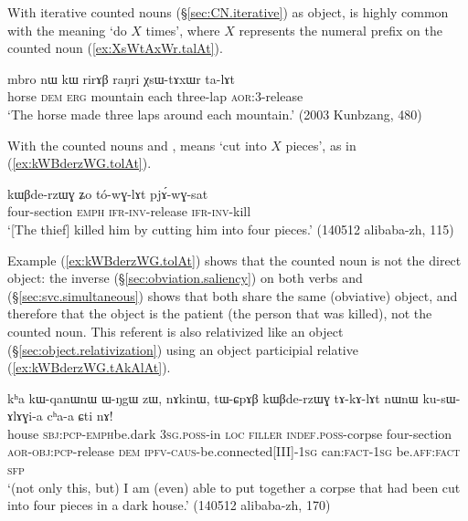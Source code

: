With iterative counted nouns (§\ref{sec:CN.iterative}) as object,  is highly common with the meaning `do $X$ times', where $X$ represents the numeral prefix on the counted noun  (\ref{ex:XsWtAxWr.talAt}).

\begin{exe}
\ex \label{ex:XsWtAxWr.talAt}
\gll mbro nɯ kɯ rirɤβ raŋri χsɯ-tɤxɯr ta-lɤt \\ 
horse \textsc{dem} \textsc{erg} mountain each three-lap \textsc{aor}:3\flobv{}-release \\
\glt `The horse made three laps around each mountain.' (2003 Kunbzang, 480)
\end{exe}

With the counted nouns  and ,  means `cut into $X$ pieces', as in (\ref{ex:kWBderzWG.tolAt}).

\begin{exe}
\ex \label{ex:kWBderzWG.tolAt}
\gll  kɯβde-rzɯɣ ʑo tó-wɣ-lɤt pjɤ́-wɣ-sat \\
four-section \textsc{emph} \textsc{ifr}-\textsc{inv}-release \textsc{ifr}-\textsc{inv}-kill \\
\glt `[The thief] killed him by cutting him into four pieces.' (140512 alibaba-zh, 115)
\end{exe}

Example (\ref{ex:kWBderzWG.tolAt}) shows that the counted noun is not the direct object: the inverse (§\ref{sec:obviation.saliency}) on both verbs  and  (§\ref{sec:svc.simultaneous}) shows that both share the same (obviative) object, and therefore that the object is the patient (the person that was killed), not the counted noun. This referent is also relativized like an object (§\ref{sec:object.relativization}) using an object participial relative (\ref{ex:kWBderzWG.tAkAlAt}).

\begin{exe}
\ex \label{ex:kWBderzWG.tAkAlAt}
\gll kʰa kɯ-qanɯ\redp{}nɯ ɯ-ŋgɯ zɯ, nɤkinɯ, tɯ-ɕpɤβ kɯβde-rzɯɣ tɤ-kɤ-lɤt nɯnɯ ku-sɯ-ɤlɤɣi-a cʰa-a ɕti nɤ! \\
house \textsc{sbj}:\textsc{pcp}-\textsc{emph}\redp{}be.dark \textsc{3sg}.\textsc{poss}-in \textsc{loc} \textsc{filler} \textsc{indef}.\textsc{poss}-corpse four-section \textsc{aor}-\textsc{obj}:\textsc{pcp}-release \textsc{dem} \textsc{ipfv}-\textsc{caus}-be.connected[III]-\textsc{1sg} can:\textsc{fact}-\textsc{1sg} be.\textsc{aff}:\textsc{fact} \textsc{sfp} \\
\glt `(not only this, but) I am (even) able to put together a corpse that had been cut into four pieces in a dark house.' (140512 alibaba-zh, 170)
\end{exe}

